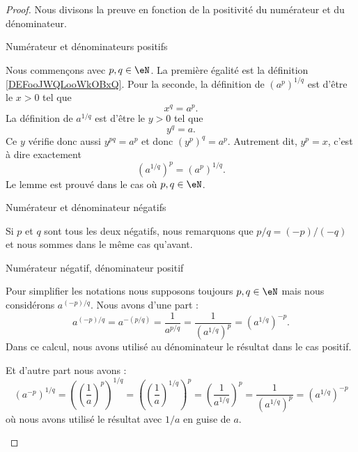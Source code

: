 \begin{proof}
    Nous divisons la preuve en fonction de la positivité du numérateur et du dénominateur.
    \begin{subproof}
        \item[Numérateur et dénominateurs positifs]
                
            Nous commençons avec \( p,q\in \eN\). La première égalité est la définition \ref{DEFooJWQLooWkOBxQ}. Pour la seconde, la définition de \( (a^p)^{1/q}\) est d'être le \( x>0\) tel que
            \begin{equation}
                x^q=a^p.
            \end{equation}
            La définition de \( a^{1/q}\) est d'être le \( y>0\) tel que
            \begin{equation}
                y^q=a.
            \end{equation}
            Ce \( y\) vérifie donc aussi \( y^{pq}=a^p\) et donc \( (y^p)^q=a^p\). Autrement dit, \( y^p=x\), c'est à dire exactement
            \begin{equation}
                (a^{1/q})^p=(a^p)^{1/q}.
            \end{equation}
            Le lemme est prouvé dans le cas où \( p,q\in \eN\).

        \item[Numérateur et dénominateur négatifs]

            Si \( p\) et \( q\) sont tous les deux négatifs, nous remarquons que \( p/q=(-p)/(-q)\) et nous sommes dans le même cas qu'avant.

        \item[Numérateur négatif, dénominateur positif]

            Pour simplifier les notations nous supposons toujours \( p,q\in \eN\) mais nous considérons \( a^{(-p)/q}\). Nous avons d'une part :
            \begin{equation}
                a^{(-p)/q}=a^{-(p/q)}=\frac{1}{ a^{p/q} }=\frac{1}{ (a^{1/q})^p }=(a^{1/q})^{-p}.   
            \end{equation}
            Dans ce calcul, nous avons utilisé au dénominateur le résultat dans le cas positif. 

            Et d'autre part nous avons :
            \begin{equation}
                (a^{-p})^{1/q}=\left( \left( \frac{1}{ a } \right)^p \right)^{1/q}=\left( \left( \frac{1}{ a } \right)^{1/q} \right)^p=\left( \frac{1}{ a^{1/q} } \right)^p=\frac{1}{ (a^{1/q})^p }=(a^{1/q})^{-p}
            \end{equation}
            où nous avons utilisé le résultat avec \( 1/a\) en guise de \( a\).


\end{subproof}
\end{proof}
